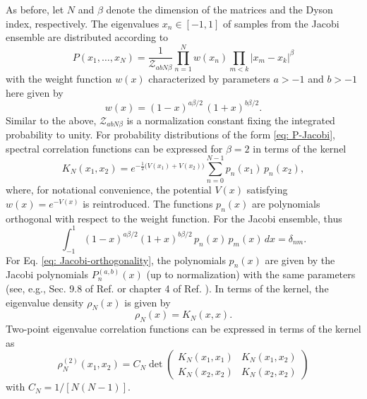 \documentclass[aps, notitlepage, floatfix, pre, twocolumn]{revtex4-2}
\begin{document}
As before, let $N$ and $\beta$ denote the dimension of the matrices and the Dyson index, respectively. The eigenvalues $x_n \in [-1,1]$ of samples from the Jacobi ensemble are distributed according to
\begin{equation}
P(x_1, \dots, x_N) = \frac{1}{\mathcal{Z}_{a b N \beta}} \prod_{n = 1}^N w(x_n) \prod_{m < k} |x_m - x_k|^\beta
\label{eq: P-Jacobi}
\end{equation}
with the weight function $w(x)$ characterized by parameters $a > -1$ and $b > -1$ here given by
\begin{equation}
w(x) = (1 - x)^{a \beta / 2} \, (1 + x)^{b \beta / 2}.
\end{equation}
Similar to the above, $\mathcal{Z}_{a b N \beta}$ is a normalization constant fixing the integrated probability to unity. For probability distributions of the form \eqref{eq: P-Jacobi}, spectral correlation functions can be expressed for $\beta = 2$ in terms of the kernel 
\begin{equation}
K_N(x_1, x_2) = e^{- \frac{1}{2} \big( V(x_1) + V(x_2) \big)} \sum_{n = 0}^{N-1} p_n (x_1) \, p_n (x_2),
\label{eq: K}
\end{equation}
where, for notational convenience, the potential $V(x)$ satisfying $w(x) = e^{-V(x)}$ is reintroduced. The functions $p_n(x)$ are polynomials orthogonal with respect to the weight function. For the Jacobi ensemble, thus
\begin{equation}
\int_{-1}^1 (1 - x)^{a \beta / 2} (1 + x)^{b \beta / 2} \, p_n(x) \, p_m(x) \, dx = \delta_{nm}.
\label{eq: Jacobi-orthogonality}
\end{equation}
For Eq. \eqref{eq: Jacobi-orthogonality}, the polynomials $p_n(x)$ are given by the Jacobi polynomials $P_n^{(a,b)}(x)$ (up to normalization) with the same parameters (see, e.g., Sec. 9.8 of Ref. \cite{Koekoek10} or chapter 4 of Ref. \cite{Szego75}). In terms of the kernel, the eigenvalue density $\rho_N (x)$ is given by
\begin{equation}
\rho_N(x) = K_N(x, x).
\label{eq: rho1}
\end{equation}
Two-point eigenvalue correlation functions can be expressed in terms of the kernel as
\begin{equation}
\rho_N^{(2)}(x_1, x_2) = C_N \det
\begin{pmatrix}
K_N(x_1, x_1) & K_N(x_1, x_2) \\
K_N(x_2, x_2) & K_N(x_2, x_2)
\end{pmatrix}
\label{eq: rho2}
\end{equation}
with $C_N = 1 / [N (N-1)]$.
\end{document}
